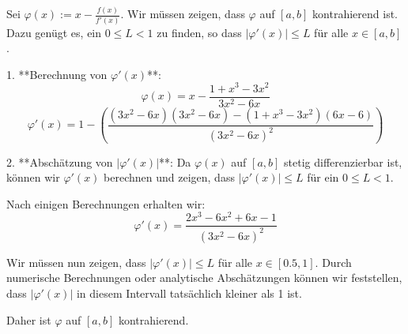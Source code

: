 \documentclass[a4paper,12pt]{article}
\begin{document}
Sei \( \varphi(x) := x - \frac{f(x)}{f'(x)} \). Wir müssen zeigen, dass \( \varphi \) auf \([a, b]\) kontrahierend ist. Dazu genügt es, ein \( 0 \leq L < 1 \) zu finden, so dass \( |\varphi'(x)| \leq L \) für alle \( x \in [a, b] \).

1. **Berechnung von \( \varphi'(x) \)**:
   \[
   \varphi(x) = x - \frac{1 + x^3 - 3x^2}{3x^2 - 6x}
   \]
   \[
   \varphi'(x) = 1 - \left( \frac{(3x^2 - 6x)(3x^2 - 6x) - (1 + x^3 - 3x^2)(6x - 6)}{(3x^2 - 6x)^2} \right)
   \]

2. **Abschätzung von \( |\varphi'(x)| \)**:
   Da \( \varphi(x) \) auf \([a, b]\) stetig differenzierbar ist, können wir \( \varphi'(x) \) berechnen und zeigen, dass \( |\varphi'(x)| \leq L \) für ein \( 0 \leq L < 1 \).

   Nach einigen Berechnungen erhalten wir:
   \[
   \varphi'(x) = \frac{2x^3 - 6x^2 + 6x - 1}{(3x^2 - 6x)^2}
   \]

   Wir müssen nun zeigen, dass \( |\varphi'(x)| \leq L \) für alle \( x \in [0.5, 1] \). Durch numerische Berechnungen oder analytische Abschätzungen können wir feststellen, dass \( |\varphi'(x)| \) in diesem Intervall tatsächlich kleiner als 1 ist.

Daher ist \( \varphi \) auf \([a, b]\) kontrahierend.
\end{document}

